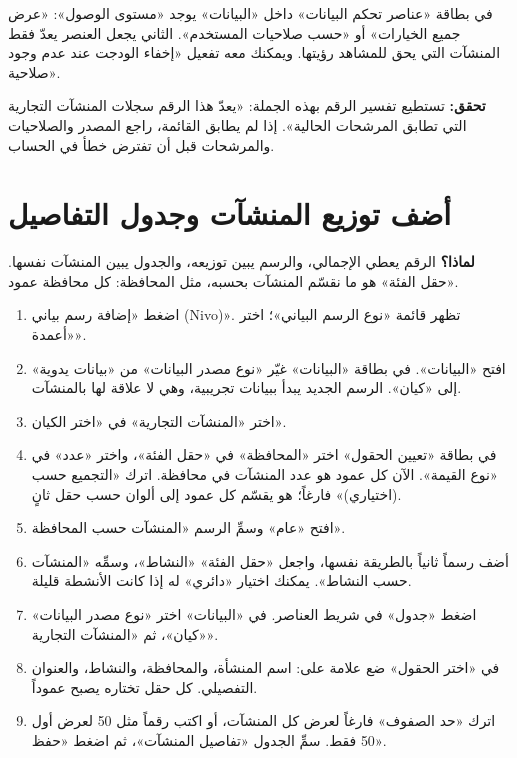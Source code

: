 \begin{rcnote}
في بطاقة «عناصر تحكم البيانات» داخل «البيانات» يوجد «مستوى الوصول»: «عرض جميع الخيارات» أو «حسب صلاحيات المستخدم». الثاني يجعل العنصر يعدّ فقط المنشآت التي يحق للمشاهد رؤيتها. ويمكنك معه تفعيل «إخفاء الودجت عند عدم وجود صلاحية».
\end{rcnote}

\textbf{تحقق:} تستطيع تفسير الرقم بهذه الجملة: «يعدّ هذا الرقم سجلات المنشآت التجارية التي تطابق المرشحات الحالية». إذا لم يطابق القائمة، راجع المصدر والصلاحيات والمرشحات قبل أن تفترض خطأ في الحساب.

\section{أضف توزيع المنشآت وجدول التفاصيل}
\label{sec:build-charts}

\textbf{لماذا؟} الرقم يعطي الإجمالي، والرسم يبين توزيعه، والجدول يبين المنشآت نفسها. «حقل الفئة» هو ما نقسّم المنشآت بحسبه، مثل المحافظة: كل محافظة عمود.

\begin{enumerate}
\item اضغط «إضافة رسم بياني (Nivo)». تظهر قائمة «نوع الرسم البياني»؛ اختر «أعمدة».
\item افتح «البيانات». في بطاقة «البيانات» غيّر «نوع مصدر البيانات» من «بيانات يدوية» إلى «كيان». الرسم الجديد يبدأ ببيانات تجريبية، وهي لا علاقة لها بالمنشآت.
\item اختر «المنشآت التجارية» في «اختر الكيان».
\item في بطاقة «تعيين الحقول» اختر «المحافظة» في «حقل الفئة»، واختر «عدد» في «نوع القيمة». الآن كل عمود هو عدد المنشآت في محافظة. اترك «التجميع حسب (اختياري)» فارغاً؛ هو يقسّم كل عمود إلى ألوان حسب حقل ثانٍ.
\item افتح «عام» وسمِّ الرسم «المنشآت حسب المحافظة».
\item أضف رسماً ثانياً بالطريقة نفسها، واجعل «حقل الفئة» «النشاط»، وسمِّه «المنشآت حسب النشاط». يمكنك اختيار «دائري» له إذا كانت الأنشطة قليلة.
\item اضغط «جدول» في شريط العناصر. في «البيانات» اختر «نوع مصدر البيانات» «كيان»، ثم «المنشآت التجارية».
\item في «اختر الحقول» ضع علامة على: اسم المنشأة، والمحافظة، والنشاط، والعنوان التفصيلي. كل حقل تختاره يصبح عموداً.
\item اترك «حد الصفوف» فارغاً لعرض كل المنشآت، أو اكتب رقماً مثل 50 لعرض أول 50 فقط. سمِّ الجدول «تفاصيل المنشآت»، ثم اضغط «حفظ».
\end{enumerate}

